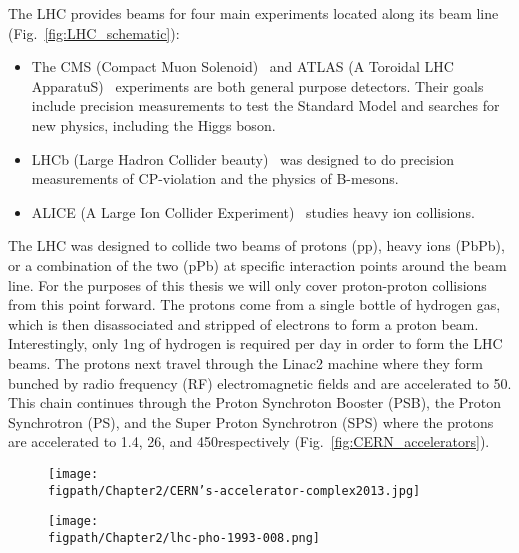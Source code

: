 The LHC provides beams for four main experiments located along its beam line (Fig.~\ref{fig:LHC_schematic}):
\begin{itemize}
	\item The CMS (Compact Muon Solenoid)~\cite{Chatrchyan:2008aa} and ATLAS (A Toroidal LHC ApparatuS)~\cite{1748-0221-3-08-S08003} experiments are both general purpose detectors. Their goals include precision measurements to test the Standard Model and searches for new physics, including the Higgs boson.
	\item LHCb (Large Hadron Collider beauty)~\cite{Alves:2008zz} was designed to do precision measurements of CP-violation and the physics of B-mesons.
	\item ALICE (A Large Ion Collider Experiment)~\cite{Aamodt:2008zz} studies heavy ion collisions.
\end{itemize}

The LHC was designed to collide two beams of protons (pp), heavy ions (PbPb), or a combination of the two (pPb) at specific interaction points around the beam line.
For the purposes of this thesis we will only cover proton-proton collisions from this point forward.
The protons come from a single bottle of hydrogen gas, which is then disassociated and stripped of electrons to form a proton beam.
Interestingly, only 1\unit{ng} of hydrogen is required per day in order to form the LHC beams.
The protons next travel through the Linac2 machine where they form bunched by radio frequency (RF) electromagnetic fields and are accelerated to 50\MeV.
This chain continues through the Proton Synchroton Booster (PSB), the Proton Synchrotron (PS), and the Super Proton Synchrotron (SPS) where the protons are accelerated to 1.4\GeV, 26\GeV, and 450\GeV respectively (Fig.~\ref{fig:CERN_accelerators}).

\begin{sidewaysfigure}[!hbt]
	\centering
	\begin{subfigure}[t]{0.4655\textwidth}
		\texttt{[image: \\figpath/Chapter2/CERN's-accelerator-complex2013.jpg]}
		\label{fig:CERN_accelerator_complex}
	\end{subfigure}
	\begin{subfigure}[t]{0.4655\textwidth}
		\texttt{[image: \\figpath/Chapter2/lhc-pho-1993-008.png]}
		\label{fig:LHC_LEP_injection_complex}
	\end{subfigure}
	\caption{Left: A schematic of the CERN accelerator complex~\cite{Marcastel:1621583}. Right: A diagram of the LHC injection chain. Also included is a diagram of the heavy ion and LEP injection chains~\cite{Jean-Luc:841568}.}
	\label{fig:CERN_accelerators}
\end{sidewaysfigure}


